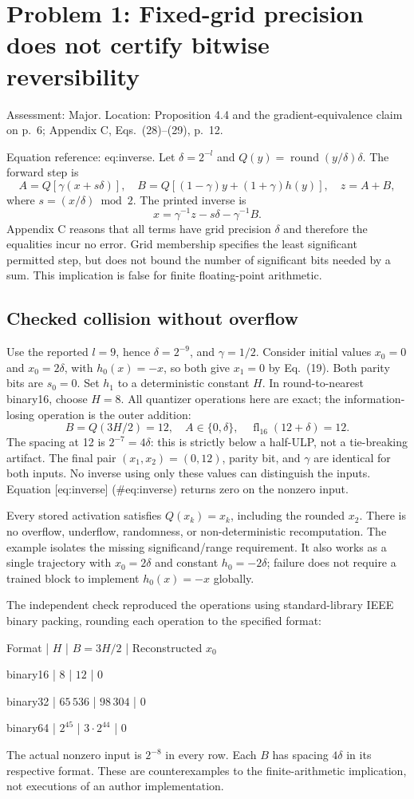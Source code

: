 \documentclass[10pt]{article}
\begin{document}
\section*{Problem 1: Fixed-grid precision does not certify bitwise reversibility}
Assessment: Major. Location: Proposition 4.4 and the gradient-equivalence claim on p. 6; Appendix C, Eqs. (28)–(29), p. 12.\par
Equation reference: eq:inverse. Let \(\delta=2^{-l}\) and \(Q(y)=\operatorname{round}(y/\delta)\delta\). The forward step is \[A=Q[\gamma(x+s\delta)],\quad
 B=Q[(1-\gamma)y+(1+\gamma)h(y)],\quad z=A+B,\] where \(s=(x/\delta)\bmod2\). The printed inverse is \[
 x=\gamma^{-1}z-s\delta-\gamma^{-1}B.\] Appendix C reasons that all terms have grid precision \(\delta\) and therefore the equalities incur no error. Grid membership specifies the least significant permitted step, but does not bound the number of significant bits needed by a sum. This implication is false for finite floating-point arithmetic.\par
\subsection*{Checked collision without overflow}
Use the reported \(l=9\), hence \(\delta=2^{-9}\), and \(\gamma=1/2\). Consider initial values \(x_0=0\) and \(x_0=2\delta\), with \(h_0(x)=-x\), so both give \(x_1=0\) by Eq. (19). Both parity bits are \(s_0=0\). Set \(h_1\) to a deterministic constant \(H\). In round-to-nearest binary16, choose \(H=8\). All quantizer operations here are exact; the information-losing operation is the outer addition: \[B=Q(3H/2)=12,\quad A\in\{0,\delta\},\quad
 \operatorname{fl}_{16}(12+\delta)=12.\] The spacing at 12 is \(2^{-7}=4\delta\): this is strictly below a half-ULP, not a tie-breaking artifact. The final pair \((x_1,x_2)=(0,12)\), parity bit, and \(\gamma\) are identical for both inputs. No inverse using only these values can distinguish the inputs. Equation [eq:inverse] (\#eq:inverse) returns zero on the nonzero input.\par
Every stored activation satisfies \(Q(x_k)=x_k\), including the rounded \(x_2\). There is no overflow, underflow, randomness, or non-deterministic recomputation. The example isolates the missing significand/range requirement. It also works as a single trajectory with \(x_0=2\delta\) and constant \(h_0=-2\delta\); failure does not require a trained block to implement \(h_0(x)=-x\) globally.\par
The independent check reproduced the operations using standard-library IEEE binary packing, rounding each operation to the specified format:\par
Format | \(H\) | \(B=3H/2\) | Reconstructed \(x_0\)\par
binary16 | \(8\) | \(12\) | \(0\)\par
binary32 | \(65\,536\) | \(98\,304\) | \(0\)\par
binary64 | \(2^{45}\) | \(3\cdot2^{44}\) | \(0\)\par
The actual nonzero input is \(2^{-8}\) in every row. Each \(B\) has spacing \(4\delta\) in its respective format. These are counterexamples to the finite-arithmetic implication, not executions of an author implementation.\par
\end{document}
